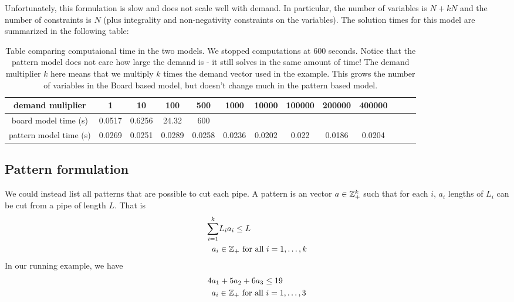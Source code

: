 Unfortunately, this formulation is slow and does not scale well with demand.  In particular, the number of variables is $N + kN$ and the number of constraints is $N$ (plus integrality and non-negativity constraints on the variables).  
The solution times for this model are summarized in the following table:
\begin{table}
\begin{tabular}{ccccccccccccc}
\hline
demand muliplier & 1& 10& 100& 500& 1000& 10000& 100000& 200000& 400000\\
\hline
board model time (s) & 0.0517& 0.6256& 24.32& 600\\
pattern model time (s) & 0.0269&
 0.0251&
 0.0289&
 0.0258&
 0.0236&
 0.0202&
 0.022&
 0.0186&
 0.0204\\
 \hline
 \end{tabular}
 \caption{Table comparing computaional time in the two models.  We stopped computations at 600 seconds.   Notice that the pattern model does not care how large the demand is - it still solves in the same amount of time!  The demand multiplier $k$ here means that we multiply $k$ times the demand vector used in the example.  This grows the number of variables in the Board based model, but doesn't change much in the pattern based model.}
\end{table}



\subsection{Pattern formulation}
We could instead list all patterns that are possible to cut each pipe.   A pattern is an vector $a \in {\mathbb{Z}}^k_+$ such that for each $i$, $a_i$ lengths of $L_i$ can be cut from a pipe of length $L$.  That is
\begin{equation}
\begin{split}
\sum_{i=1}^k &L_i a_i \leq L\\
a_i &\in {\mathbb{Z}}_+ \ \mbox{for all } i=1, \dots, k
\end{split}
\end{equation}
In our running example, we have 
\begin{equation}
\begin{split}
4 &a_1 + 5 a_2 + 6 a_3 \leq 19\\
&a_i \in {\mathbb{Z}}_+ \ \mbox{for all } i=1, \dots, 3
\end{split}
\end{equation}


